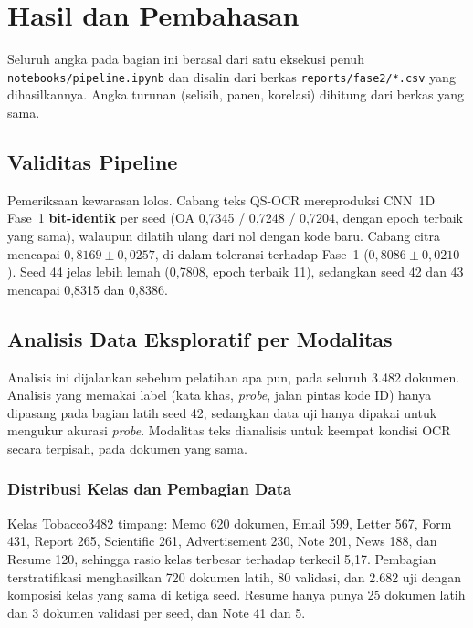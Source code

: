 \section{Hasil dan Pembahasan}\label{sec:hasil}

Seluruh angka pada bagian ini berasal dari satu eksekusi penuh
\texttt{notebooks/pipeline.ipynb} dan disalin dari berkas \texttt{reports/fase2/*.csv}
yang dihasilkannya. Angka turunan (selisih, panen, korelasi) dihitung dari berkas yang
sama.

\subsection{Validitas Pipeline}\label{sec:validitas}

Pemeriksaan kewarasan lolos. Cabang teks QS-OCR mereproduksi CNN~1D Fase~1
\textbf{bit-identik} per seed (OA 0,7345 / 0,7248 / 0,7204, dengan epoch terbaik yang
sama), walaupun dilatih ulang dari nol dengan kode baru. Cabang citra mencapai
$0{,}8169 \pm 0{,}0257$, di dalam toleransi terhadap Fase~1 ($0{,}8086 \pm 0{,}0210$).
Seed 44 jelas lebih lemah (0,7808, epoch terbaik 11), sedangkan seed 42 dan 43 mencapai
0,8315 dan 0,8386.

\subsection{Analisis Data Eksploratif per Modalitas}\label{sec:eda}

Analisis ini dijalankan sebelum pelatihan apa pun, pada seluruh 3.482 dokumen. Analisis
yang memakai label (kata khas, \textit{probe}, jalan pintas kode ID) hanya dipasang pada
bagian latih seed 42, sedangkan data uji hanya dipakai untuk mengukur akurasi
\textit{probe}. Modalitas teks dianalisis untuk keempat kondisi OCR secara terpisah, pada
dokumen yang sama.

\subsubsection{Distribusi Kelas dan Pembagian Data}

Kelas Tobacco3482 timpang: Memo 620 dokumen, Email 599, Letter 567, Form 431, Report
265, Scientific 261, Advertisement 230, Note 201, News 188, dan Resume 120, sehingga rasio
kelas terbesar terhadap terkecil 5,17. Pembagian terstratifikasi menghasilkan 720 dokumen
latih, 80 validasi, dan 2.682 uji dengan komposisi kelas yang sama di ketiga seed. Resume
hanya punya 25 dokumen latih dan 3 dokumen validasi per seed, dan Note 41 dan 5.

